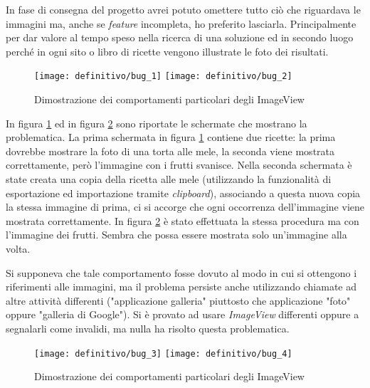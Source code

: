 In fase di consegna del progetto avrei potuto omettere tutto ciò che riguardava le immagini ma, anche se \textit{feature} incompleta, ho preferito lasciarla.
Principalmente per dar valore al tempo speso nella ricerca di una soluzione ed in secondo luogo perché in ogni sito o libro di ricette vengono illustrate le foto dei risultati.

\begin{figure}[ht]
  \begin{center}
    \texttt{[image: definitivo/bug\_1]}
    \texttt{[image: definitivo/bug\_2]}
    \caption{Dimostrazione dei comportamenti particolari degli ImageView}
    \label{fig:bug_1}
  \end{center}
\end{figure}

In figura \ref{fig:bug_1} ed in figura \ref{fig:bug_2} sono riportate le schermate che mostrano la problematica.
La prima schermata in figura \ref{fig:bug_1} contiene due ricette: la prima dovrebbe mostrare la foto di una torta alle mele, la seconda viene mostrata correttamente, però l'immagine con i frutti svanisce.
Nella seconda schermata è state creata una copia della ricetta alle mele (utilizzando la funzionalità di esportazione ed importazione tramite \textit{clipboard}), associando a questa nuova copia la stessa immagine di prima, ci si accorge che ogni occorrenza dell'immagine viene mostrata correttamente.
In figura \ref{fig:bug_2} è stato effettuata la stessa procedura ma con l'immagine dei frutti.
Sembra che possa essere mostrata solo un'immagine alla volta.

Si supponeva che tale comportamento fosse dovuto al modo in cui si ottengono i riferimenti alle immagini, ma il problema persiste anche utilizzando chiamate ad altre attività differenti ("applicazione galleria" piuttosto che applicazione "foto" oppure "galleria di Google").
Si è provato ad usare \textit{ImageView} differenti oppure a segnalarli come invalidi, ma nulla ha risolto questa problematica.


\begin{figure}[ht]
  \begin{center}
    \texttt{[image: definitivo/bug\_3]}
    \texttt{[image: definitivo/bug\_4]}
    \caption{Dimostrazione dei comportamenti particolari degli ImageView}
    \label{fig:bug_2}
  \end{center}
\end{figure}

